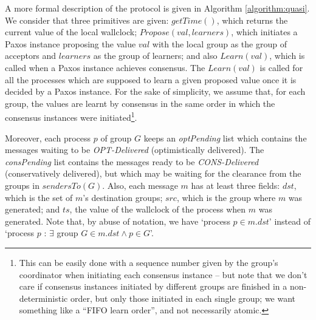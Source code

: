\documentclass[times, 10pt]{article}
\begin{document}

A more formal description of the protocol is given in Algorithm \ref{algorithm:quasi}. We consider that three primitives are given: $getTime()$, which returns the current value of the local wallclock; $Propose(val, learners)$, which initiates a Paxos \cite{paxosref} instance proposing the value $val$ with the local group as the group of acceptors and $learners$ as the group of learners; and also $Learn(val)$, which is called when a Paxos instance achieves consensus. The $Learn(val)$ is called for all the processes which are supposed to learn a given proposed value once it is decided by a Paxos instance. For the sake of simplicity, we assume that, for each group, the values are learnt by consensus in the same order in which the consensus instances were initiated\footnote{This can be easily done with a sequence number given by the group's coordinator when initiating each consensus instance -- but note that we don't care if consensus instances initiated by different groups are finished in a non-deterministic order, but only those initiated in each single group; we want something like a ``FIFO learn order'', and not necessarily atomic.}.

Moreover, each process $p$ of group $G$ keeps an \textit{optPending} list which contains the messages waiting to be \textit{OPT-Delivered} (optimistically delivered). The \mbox{\textit{consPending}} list contains the messages ready to be \textit{CONS-Delivered} (conservatively delivered), but which may be waiting for the clearance from the groups in $sendersTo(G)$. Also, each message $m$ has at least three fields: $dst$, which is the set of $m$'s destination groups; $src$, which is the group where $m$ was generated; and $ts$, the value of the wallclock of the process when $m$ was generated. Note that, by abuse of notation, we have `process $p \in m.dst$' instead of `process $p$ : $\exists$ group $G \in m.dst \wedge p \in G$'.
\end{document}
